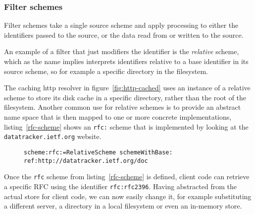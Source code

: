 \documentclass[preprint,authoryear]{llncs}
\begin{document}
\subsubsection{Filter schemes}
\label{filterschemes}
Filter schemes take a single source scheme and apply processing to either
the identifiers passed to the source, or the data read from or written to the source.

An example of a filter that just modifiers the identifier is the \emph{relative}
scheme, which as the name implies interprets identifiers relative to a base
identifier in its source scheme, so for example a specific directory in the
filesystem.  

The caching http resolver in figure~\ref{fig:http-cached} uses an instance
of a relative scheme to store its disk cache in a specific directory, rather
than the root of the filesystem.  Another common use for relative schemes
is to provide an abstract name space that is then mapped to one
or more  concrete implementations, listing~\ref{rfc-scheme} shows
an {\tt rfc:} scheme that is implemented by looking at the {\tt datatracker.ietf.org}
website.


\begin{figure}[htbp]
\begin{lstlisting}[style=L,label=rfc-scheme,caption=Defining a custom rfc: scheme.]
scheme:rfc:=RelativeScheme schemeWithBase: ref:http://datatracker.ietf.org/doc
\end{lstlisting}
\end{figure}

Once the {\tt rfc} scheme from listing~\ref{rfc-scheme} is defined, client code can 
retrieve a specific RFC using the identifier {\tt  rfc:rfc2396}.  Having abstracted
from the actual store for client code, we can now easily change it, for example
substituting a different server, a directory in a local filesystem or even an 
in-memory store.



\end{document}
